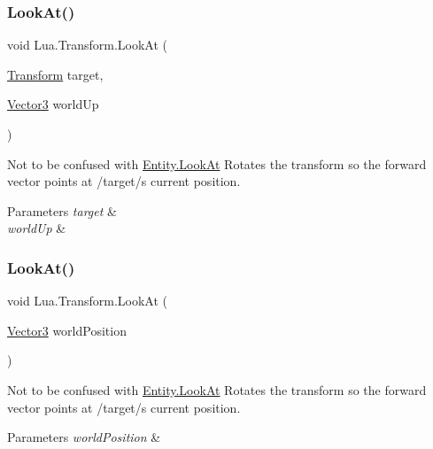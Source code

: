 \subsubsection{\texorpdfstring{LookAt()}{LookAt()}\hspace{0.1cm}{\footnotesize\ttfamily [2/4]}}
{\footnotesize\ttfamily void Lua.\+Transform.\+Look\+At (\begin{DoxyParamCaption}\item[{\mbox{\hyperlink{class_lua_1_1_transform}{Transform}}}]{target,  }\item[{\mbox{\hyperlink{class_lua_1_1_vector3}{Vector3}}}]{world\+Up }\end{DoxyParamCaption})}



Not to be confused with \mbox{\hyperlink{class_lua_1_1_entity_a29cdb052c5422873a708c8080039cb4b}{Entity.\+Look\+At}} Rotates the transform so the forward vector points at /target/\textquotesingle{}s current position. 


\begin{DoxyParams}{Parameters}
{\em target} & \\
\hline
{\em world\+Up} & \\
\hline
\end{DoxyParams}
\mbox{\label{class_lua_1_1_transform_aa8630c1feef1c89cf7a201f6c92005ee}} 
\subsubsection{\texorpdfstring{LookAt()}{LookAt()}\hspace{0.1cm}{\footnotesize\ttfamily [3/4]}}
{\footnotesize\ttfamily void Lua.\+Transform.\+Look\+At (\begin{DoxyParamCaption}\item[{\mbox{\hyperlink{class_lua_1_1_vector3}{Vector3}}}]{world\+Position }\end{DoxyParamCaption})}



Not to be confused with \mbox{\hyperlink{class_lua_1_1_entity_a29cdb052c5422873a708c8080039cb4b}{Entity.\+Look\+At}} Rotates the transform so the forward vector points at /target/\textquotesingle{}s current position. 


\begin{DoxyParams}{Parameters}
{\em world\+Position} & \\
\hline
\end{DoxyParams}
\mbox{\label{class_lua_1_1_transform_a9364734c07f954378c167f7f5258fa18}} 
